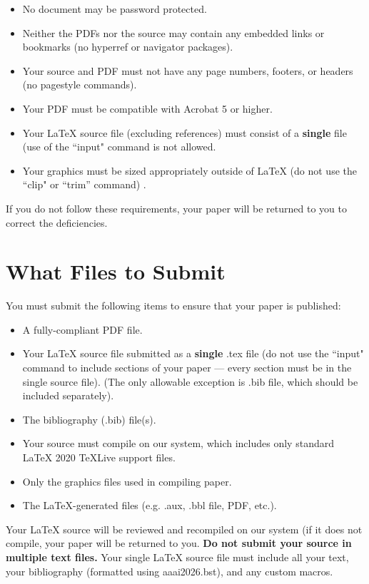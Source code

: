 \begin{itemize}
\item No document may be password protected.
\item Neither the PDFs nor the source may contain any embedded links or bookmarks (no hyperref or navigator packages).
\item Your source and PDF must not have any page numbers, footers, or headers (no pagestyle commands).
\item Your PDF must be compatible with Acrobat 5 or higher.
\item Your \LaTeX{} source file (excluding references) must consist of a \textbf{single} file (use of the ``input" command is not allowed.
\item Your graphics must be sized appropriately outside of \LaTeX{} (do not use the ``clip" or ``trim'' command) .
\end{itemize}

If you do not follow these requirements, your paper will be returned to you to correct the deficiencies.

\section{What Files to Submit}
You must submit the following items to ensure that your paper is published:
\begin{itemize}
\item A fully-compliant PDF file.
\item Your \LaTeX{} source file submitted as a \textbf{single} .tex file (do not use the ``input" command to include sections of your paper --- every section must be in the single source file). (The only allowable exception is .bib file, which should be included separately).
\item The bibliography (.bib) file(s).
\item Your source must compile on our system, which includes only standard \LaTeX{} 2020 TeXLive support files.
\item Only the graphics files used in compiling paper.
\item The \LaTeX{}-generated files (e.g. .aux,  .bbl file, PDF, etc.).
\end{itemize}

Your \LaTeX{} source will be reviewed and recompiled on our system (if it does not compile, your paper will be returned to you. \textbf{Do not submit your source in multiple text files.} Your single \LaTeX{} source file must include all your text, your bibliography (formatted using aaai2026.bst), and any custom macros.

